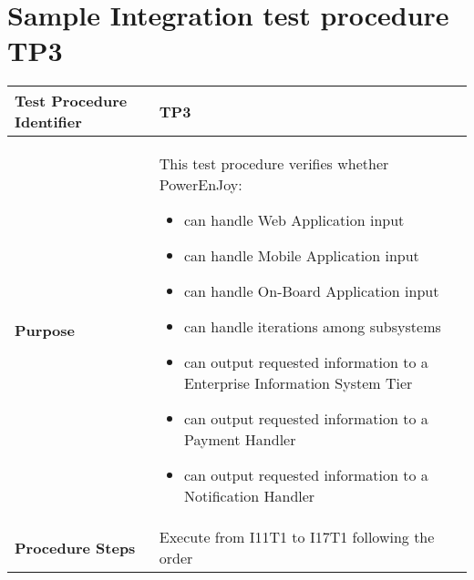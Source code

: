 \section{Sample Integration test procedure TP3} \label{TP3}
\begin{center}
	\vspace{0.6cm}
	\begin{tabular}{|l|p{9cm}|}
		\hline
		\textbf{Test Procedure Identifier} & TP3 \bigstrut \\\hline
		\textbf{Purpose} 
		& This test procedure verifies whether PowerEnJoy: 
		\begin{itemize} 
			\item can handle Web Application input
			\item can handle Mobile Application input
			\item can handle On-Board Application input
			\item can handle iterations among subsystems 
			\item can output requested information to a Enterprise Information System Tier
			\item can output requested information to a Payment Handler
			\item can output requested information to a Notification Handler
		\end{itemize} \bigstrut \\\hline
		\textbf{Procedure Steps} & Execute from I11T1 to I17T1 following the order \bigstrut \\\hline
	\end{tabular}
\end{center}